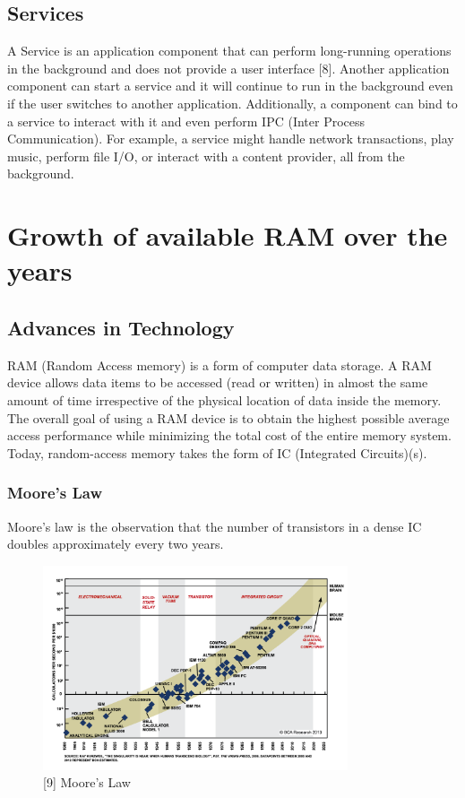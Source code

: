 \documentclass[12pt]{uthesis-v12}  %
\begin{document}
			\subsection{Services}
				A Service is an application component that can perform long-running operations in the background and does not provide a user interface [8]. Another application component can start a service and it will continue to run in the background even if the user switches to another application. Additionally, a component can bind to a service to interact with it and even perform IPC (Inter Process Communication). For example, a service might handle network transactions, play music, perform file I/O, or interact with a content provider, all from the background.
					 	
	\section{Growth of available RAM over the years}
		
		\subsection{Advances in Technology}
			RAM (Random Access memory) is a form of computer data storage. A RAM device allows data items to be accessed (read or written) in almost the same amount of time irrespective of the physical location of data inside the memory. The overall goal of using a RAM device is to obtain the highest possible average access performance while minimizing the total cost of the entire memory system. Today, random-access memory takes the form of IC (Integrated Circuits)(s).
		
			\subsubsection{Moore's Law}
				Moore's law is the observation that the number of transistors in a dense IC doubles approximately every two years.
				
				\begin{figure}[h]
					\centering
					\includegraphics[width = 90mm]{images/mooresLaw.png}
					\caption[Moore's law]{[9] Moore's Law}
				\end{figure}
				
\end{document}
